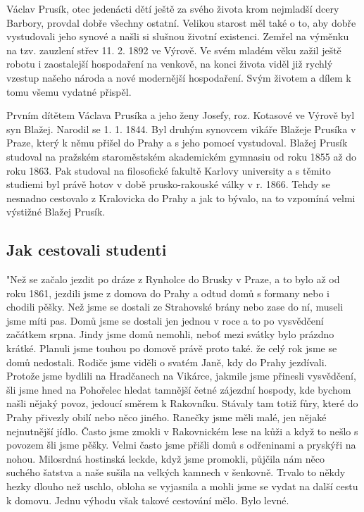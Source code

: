 \documentclass[../dejiny-rodu-prusiku.tex]{subfiles}
\begin{document}
Václav Prusík, otec jedenácti dětí ještě za svého života krom nejmladší dcery Barbory, provdal dobře všechny ostatní. Velikou starost měl také o to, aby dobře vystudovali jeho synové a našli si slušnou životní existenci. Zemřel na výměnku na tzv. zauzlení střev 11. 2. 1892 ve Výrově. Ve svém mladém věku zažil ještě robotu i zaostalejší hospodaření na venkově, na konci života viděl již rychlý vzestup našeho národa a nové modernější hospodaření. Svým životem a dílem k tomu všemu vydatné přispěl.

Prvním dítětem Václava Prusíka a jeho ženy Josefy, roz. Kotasové ve Výrově byl syn Blažej. Narodil se 1. 1. 1844. Byl druhým synovcem vikáře Blažeje Prusíka v Praze, který k němu přišel do Prahy a s jeho pomocí vystudoval. Blažej Prusík studoval na pražském staroměstském akade­mickém gymnasiu od roku 1855 až do roku 1863. Pak stu­doval na filosofické fakultě Karlovy university a s těmito studiemi byl právě hotov v době prusko-rakouské války v r. 1866. Tehdy se nesnadno cestovalo z Kralovicka do Prahy a jak to bývalo, na to vzpomíná velmi výstižné Blažej Prusík.

\subsection{Jak cestovali studenti}

"Než se začalo jezdit po dráze z Rynholce do Brusky v Praze, a to bylo až od roku 1861, jezdili jsme z domova do Prahy a odtud domů s formany nebo i chodili pěšky. Než jsme se dostali ze Strahovské brány nebo zase do ní, museli jsme míti pas. Domů jsme se dostali jen jednou v roce a to po vysvědčení začátkem srpna. Jindy jsme do­mů nemohli, neboť mezi svátky bylo prázdno krátké. Planuli jsme touhou po domově právě proto také. že celý rok jsme se domů nedostali. Rodiče jsme viděli o svatém Janě, kdy do Prahy jezdívali. Protože jsme bydlili na Hradčanech na Vikárce, jakmile jsme přinesli vysvědčení, šli jsme hned na Pohořelec hledat tamnější četné zájezdní hospody, kde bychom našli nějaký povoz, jedoucí směrem k Rakovníku. Stávaly tam totiž fůry, které do Prahy přivezly obilí nebo něco jiného. Ranečky jsme měli malé, jen nějaké nejnutnější jídlo. Často jsme zmokli v Rakovnickém lese na kůži a když to nešlo s povozem šli jsme pěšky. Velmi často jsme přišli domů s odřeninami a pryskýři na nohou. Milosrdná hostinská leckde, když jsme promokli, půjčila nám něco suchého šatstva a naše sušila na velkých kamnech v šenkovně. Trvalo to někdy hezky dlouho než uschlo, obloha se vyjasnila a mohli jsme se vydat na další cestu k domovu. Jednu výhodu však takové cestování mělo. Bylo levné.
\end{document}
